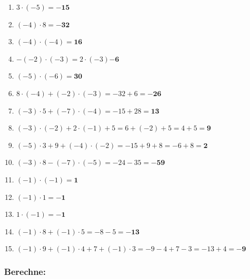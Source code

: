 \documentclass[a4paper,10pt]{article} %
\begin{document}
\begin{enumerate}[label=\alph*)]

  \item \(3 \cdot (-5) =
    \mathbf{-15}\) %

  \item \((-4) \cdot 8 =
    \mathbf{-32}\) %

  \item \((-4) \cdot (-4) =
    \mathbf{16}\) %

  \item \(-(-2) \cdot (-3) =
    2 \cdot (-3)
    \mathbf{-6}\) %

  \item \((-5) \cdot (-6) =
    \mathbf{30}\) %

  \item \(8 \cdot (-4) + (-2) \cdot (-3) =
    -32 + 6 =
    \mathbf{-26}\) %

  \item \((-3) \cdot 5 + (-7) \cdot (-4) =
    -15 + 28 =
    \mathbf{13}\) %

  \item \((-3) \cdot (-2) + 2 \cdot (-1) + 5 =
    6 + (-2) + 5 =
    4 + 5 =
    \mathbf{9}\) %

  \item \((-5) \cdot 3 + 9 + (-4) \cdot (-2) =
    -15 + 9 + 8 =
    -6 + 8 =
    \mathbf{2}\) %

  \item \((-3) \cdot 8 - (-7) \cdot (-5) =
    -24 - 35 =
    \mathbf{-59}\) %

  \item \((-1) \cdot (-1) =
    \mathbf{1}\) %

  \item \((-1) \cdot 1 =
    \mathbf{-1}\) %

  \item \(1 \cdot (-1) =
    \mathbf{-1}\) %

  \item \((-1) \cdot 8 + (-1) \cdot 5 =
    -8 - 5 =
    \mathbf{-13}\) %

  \item \((-1) \cdot 9 + (-1) \cdot 4 + 7 + (-1) \cdot 3 =
    -9 - 4 + 7 - 3 =
    -13 + 4 =
    \mathbf{-9}\) %

  \end{enumerate}

\subsubsection{Berechne:} %
\end{document}
